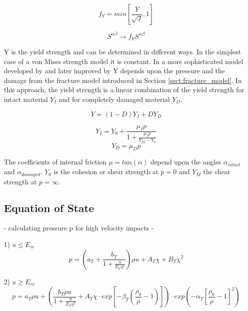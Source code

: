 \begin{equation}
    f_Y = min \left[\frac{Y}{\sqrt{J}}, 1 \right]
\end{equation}

\begin{equation}
    S^{\alpha \beta} \rightarrow f_Y S^{\alpha \beta}
\end{equation}

Y is the yield strength and can be determined in different ways. In the simplest case of a von Mises strength model it is constant. In a more sophisticated model developed by \cite{Collins_2004} and later improved by \cite{Jutzi_2015} Y depends upon the pressure and the damage from the fracture model introduced in Section \ref{sect:fracture_model}. In this approach, the yield strength is a linear combination of the yield strength for intact material $Y_I$ and for completely damaged material $Y_D$.

\begin{equation}
    Y = \left(1 - D \right)Y_I + DY_D
\end{equation}

\begin{equation}
    Y_I = Y_0 + \frac{\mu_I p}{1 + \frac{\mu_I p}{Y_M - Y_0}}
\end{equation}
\begin{equation}
    Y_D = \mu_D p
\end{equation}

The coefficients of internal friction $\mu = tan(\alpha)$ depend upon the angles $\alpha_{intact}$ and $\alpha_{damaged}$. $Y_0$ is the cohesion or shear strength at $p = 0$ and $Y_M$ the shear strength at $p = \infty$.


\subsection{Equation of State}
- calculating pressure p for high velocity impacts
- \cite{Tillotson_1962}

1) $u \leq E_{iv}$
\begin{equation}
    p = \left(a_T + \frac{b_T}{1 + \frac{u}{E_0\eta^2}}\right)\rho u + A_T \chi + B_T \chi^2
\end{equation}


2) $u \geq E_{cv}$
\begin{equation}
    p = a_T \rho u + \left( \frac{b_T \rho u}{1 + \frac{u}{E_0 \eta^2}} + A_T \chi \cdot exp\left[-\beta_T\left(\frac{\rho_0}{\rho} - 1\right)\right] \right) \cdot exp \left(-\alpha_T \left[\frac{\rho_0}{\rho} - 1 \right]^2 \right)
\end{equation}


